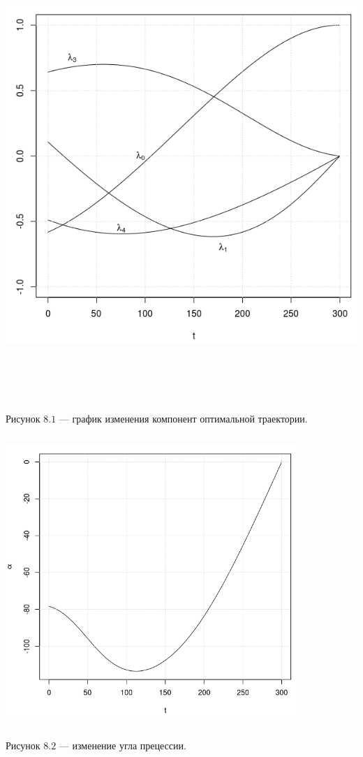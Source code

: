 \documentclass[14pt]{extreport}
\begin{document}
\begin{center}
\vspace*{50px}
\includegraphics[width=17cm, height=17cm]{l300.png}

Рисунок $8.1$ --- график изменения компонент оптимальной траектории. 
\end{center}

\begin{center}
\includegraphics[width=11cm, height=11cm]{alpha.png}

Рисунок $8.2$  --- изменение угла прецессии. 
\end{center}
\end{document}
